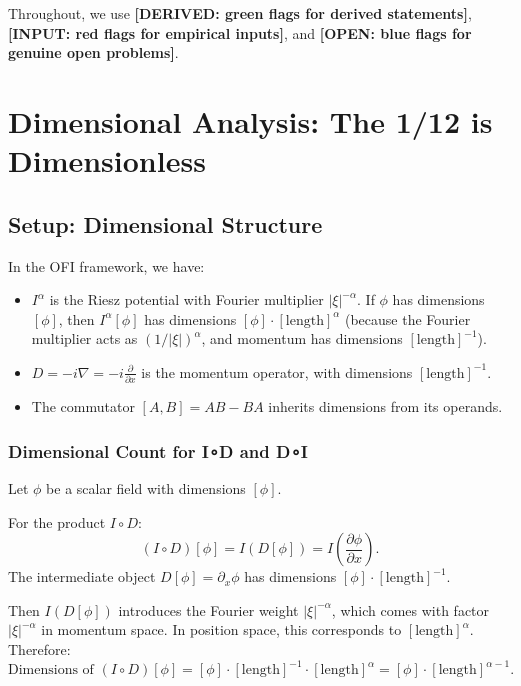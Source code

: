 \documentclass[12pt]{article}
\theoremstyle{definition}
\newcommand{\DERIVED}[1]{\textcolor{derivedcolor}{\textbf{[DERIVED: #1]}}}
\newcommand{\INPUT}[1]{\textcolor{inputcolor}{\textbf{[INPUT: #1]}}}
\newcommand{\OPEN}[1]{\textcolor{opencolor}{\textbf{[OPEN: #1]}}}
\begin{document}
Throughout, we use \DERIVED{green flags for derived statements}, \INPUT{red flags for
empirical inputs}, and \OPEN{blue flags for genuine open problems}.

\section{Dimensional Analysis: The 1/12 is Dimensionless}
\label{sec:dimensional}

\subsection{Setup: Dimensional Structure}

In the OFI framework, we have:
\begin{itemize}
  \item $I^\alpha$ is the Riesz potential with Fourier multiplier $|\xi|^{-\alpha}$.
    If $\phi$ has dimensions $[\phi]$, then $I^\alpha[\phi]$ has dimensions
    $[\phi] \cdot [\mathrm{length}]^\alpha$ (because the Fourier multiplier acts as
    $(1/|\xi|)^\alpha$, and momentum has dimensions $[\mathrm{length}]^{-1}$).

  \item $D = -i\nabla = -i \frac{\partial}{\partial x}$ is the momentum operator,
    with dimensions $[\mathrm{length}]^{-1}$.

  \item The commutator $[A, B] = AB - BA$ inherits dimensions from its operands.
\end{itemize}

\subsubsection{Dimensional Count for I∘D and D∘I}

Let $\phi$ be a scalar field with dimensions $[\phi]$.

For the product $I\circ D$:
\begin{equation}
  (I\circ D)[\phi] = I(D[\phi]) = I\left(\frac{\partial \phi}{\partial x}\right).
\end{equation}
The intermediate object $D[\phi] = \partial_x \phi$ has dimensions
$[\phi] \cdot [\mathrm{length}]^{-1}$.

Then $I(D[\phi])$ introduces the Fourier weight $|\xi|^{-\alpha}$, which comes with
factor $|\xi|^{-\alpha}$ in momentum space. In position space, this corresponds to
$[\mathrm{length}]^\alpha$. Therefore:
\begin{equation}
  \text{Dimensions of } (I\circ D)[\phi] = [\phi] \cdot [\mathrm{length}]^{-1} \cdot [\mathrm{length}]^\alpha
  = [\phi] \cdot [\mathrm{length}]^{\alpha-1}.
\end{equation}
\end{document}
